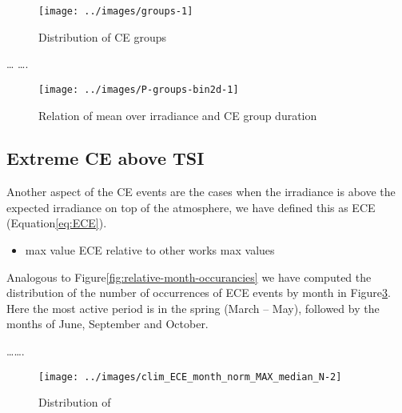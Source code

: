 \documentclass[preprint, 3p,
authoryear]{elsarticle} %
\providecommand{\tightlist}{%
  \setlength{\itemsep}{0pt}\setlength{\parskip}{0pt}}
\begin{document}
\begin{figure}

{\centering \texttt{[image: ../images/groups-1]} 

}

\caption{Distribution of CE groups}\label{fig:ceg-duration-distribution}
\end{figure}

\ldots{} \citet{Zhang2018} \ldots.

\begin{figure}

{\centering \texttt{[image: ../images/P-groups-bin2d-1]} 

}

\caption{Relation of mean over irradiance and CE group duration}\label{fig:unnamed-chunk-3}
\end{figure}

\hypertarget{extreme-ce-above-tsi}{%
\subsection{Extreme CE above TSI}\label{extreme-ce-above-tsi}}

Another aspect of the CE events are the cases when the irradiance is
above the expected irradiance on top of the atmosphere, we have defined
this as ECE (Equation\nobreakspace{}\ref{eq:ECE}).

\begin{itemize}
\tightlist
\item
  max value ECE relative to other works max values
\end{itemize}

Analogous to Figure\nobreakspace{}\ref{fig:relative-month-occurancies}
we have computed the distribution of the number of occurrences of ECE
events by month in
Figure\nobreakspace{}\ref{fig:relative-month-occurancies-ECE}. Here the
most active period is in the spring (March -- May), followed by the
months of June, September and October.

\ldots\ldots.

\begin{figure}

{\centering \texttt{[image: ../images/clim\_ECE\_month\_norm\_MAX\_median\_N-2]} 

}

\caption{Distribution of }\label{fig:relative-month-occurancies-ECE}
\end{figure}
\end{document}
